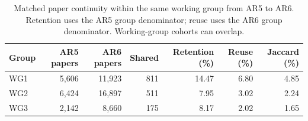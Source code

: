 \begin{table}[H]
\centering\small
\caption{Matched paper continuity within the same working group from AR5 to AR6. Retention uses the AR5 group denominator; reuse uses the AR6 group denominator. Working-group cohorts can overlap.}
\label{tab:wg_continuity}
\begin{tabular}{@{}lrrrrrr@{}}
\toprule
Group & AR5 papers & AR6 papers & Shared & Retention (\%) & Reuse (\%) & Jaccard (\%) \\
\midrule
WG1 & 5,606 & 11,923 & 811 & 14.47 & 6.80 & 4.85 \\
WG2 & 6,424 & 16,897 & 511 & 7.95 & 3.02 & 2.24 \\
WG3 & 2,142 & 8,660 & 175 & 8.17 & 2.02 & 1.65 \\
\bottomrule
\end{tabular}
\end{table}
